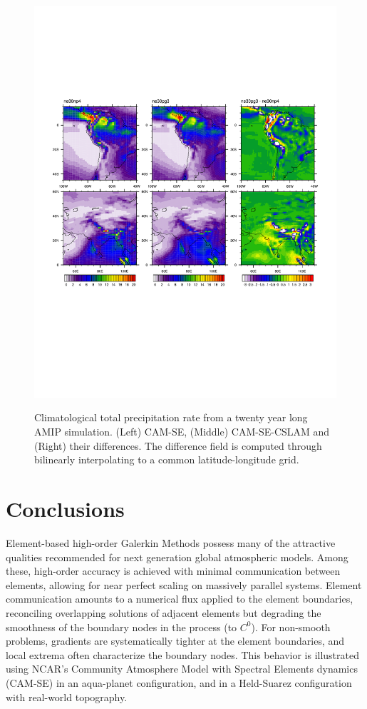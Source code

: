 \documentclass[twocol]{ametsoc}
\begin{document}
\begin{figure}[t]
\noindent\includegraphics[width=37pc,angle=0]{figs/AMIP_regional.pdf}\\
\caption{Climatological total precipitation rate from a twenty year long AMIP simulation. (Left) CAM-SE, (Middle) CAM-SE-CSLAM and (Right) their differences. The difference field is computed through bilinearly interpolating to a common latitude-longitude grid.}
\label{fig:AMIP-region}
\end{figure}

\section{Conclusions}\label{sec:conclusions}

Element-based high-order Galerkin Methods possess many of the attractive qualities recommended for next generation global atmospheric models. Among these, high-order accuracy is achieved with minimal communication between elements, allowing for near perfect scaling on massively parallel systems. Element communication amounts to a numerical flux applied to the element boundaries, reconciling overlapping solutions of adjacent elements but degrading the smoothness of the boundary nodes in the process (to $C^0$). For non-smooth problems, gradients are systematically tighter at the element boundaries, and local extrema often characterize the boundary nodes. This behavior is illustrated using NCAR's Community Atmosphere Model with Spectral Elements dynamics (CAM-SE) in an aqua-planet configuration, and in a Held-Suarez configuration with real-world topography. 
\end{document}
